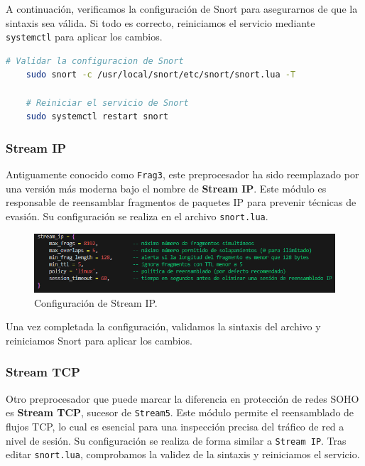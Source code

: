 \documentclass[11pt,a4paper,twoside]{report}
\begin{document}
A continuación, verificamos la configuración de Snort para asegurarnos de que la sintaxis sea válida. Si todo es correcto, reiniciamos el servicio mediante \texttt{systemctl} para aplicar los cambios.

\newpage

\begin{lstlisting}[language=bash, label={lst:validacion_snort}]
	# Validar la configuracion de Snort
	sudo snort -c /usr/local/snort/etc/snort/snort.lua -T
	
	# Reiniciar el servicio de Snort
	sudo systemctl restart snort
\end{lstlisting}


\subsubsection*{Stream IP}

Antiguamente conocido como \texttt{Frag3}, este preprocesador ha sido reemplazado por una versión más moderna bajo el nombre de \textbf{Stream IP}. Este módulo es responsable de reensamblar fragmentos de paquetes IP para prevenir técnicas de evasión. Su configuración se realiza en el archivo \texttt{snort.lua}.

\begin{figure}[H]
	\centering
	\includegraphics[scale=0.8]{stream_ip/1.png}
	\caption{Configuración de Stream IP.}
\end{figure}

Una vez completada la configuración, validamos la sintaxis del archivo y reiniciamos Snort para aplicar los cambios.

\newpage

\subsubsection*{Stream TCP}

Otro preprocesador que puede marcar la diferencia en protección de redes SOHO es \textbf{Stream TCP}, sucesor de \texttt{Stream5}. Este módulo permite el reensamblado de flujos TCP, lo cual es esencial para una inspección precisa del tráfico de red a nivel de sesión. Su configuración se realiza de forma similar a \texttt{Stream IP}. Tras editar \texttt{snort.lua}, comprobamos la validez de la sintaxis y reiniciamos el servicio.
\end{document}
